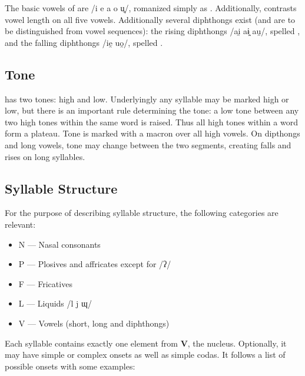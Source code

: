 The basic vowels of \lang{} are /i e a o u̥/, romanized simply as . Additionally, \lang{} contrasts vowel length on all five vowels. Additionally several diphthongs exist (and are to be distinguished from vowel sequences): the rising diphthongs /ai̯ aɨ̯ au̯/, spelled , and the falling diphthongs /ie̯ uo̯/, spelled .

\subsection{Tone}
\lang{} has two tones: high and low. Underlyingly any syllable may be marked high or low, but there is an important rule determining the tone: a low tone between any two high tones within the same word is raised. Thus all high tones within a word form a plateau. Tone is marked with a macron over all high vowels. On dipthongs and long vowels, tone may change between the two segments, creating falls and rises on long syllables.

\subsection{Syllable Structure}
For the purpose of describing syllable structure, the following categories are relevant: 

\begin{itemize}
	\item N — Nasal consonants
	\item P — Plosives and affricates except for /ʔ/
	\item F — Fricatives
	\item L — Liquids /l j ɰ/
	\item V — Vowels (short, long and diphthongs)
\end{itemize}

Each syllable contains exactly one element from \textbf{V}, the nucleus. Optionally, it may have simple or complex onsets as well as simple codas. It follows a list of possible onsets with some examples: 

